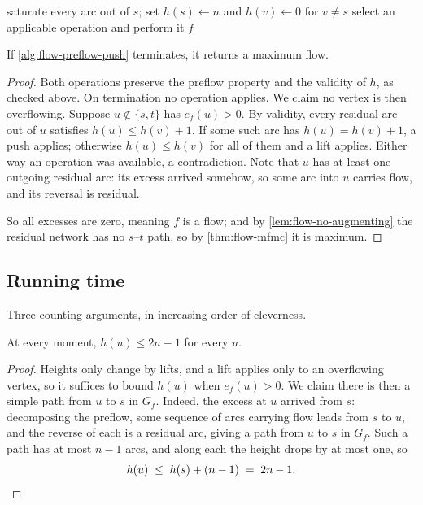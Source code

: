 \begin{algorithm}[ht]
\caption{Generic preflow-push}
\label{alg:flow-preflow-push}
\begin{algorithmic}[1]
  \State saturate every arc out of $s$; set $h(s) \gets n$ and
         $h(v) \gets 0$ for $v \ne s$
     \State select an applicable operation and perform it
  \EndWhile
  \State \Return $f$
\end{algorithmic}
\end{algorithm}

\begin{theorem}\label{thm:flow-preflow-push-correct}
If \cref{alg:flow-preflow-push} terminates, it returns a maximum flow.
\end{theorem}

\begin{proof}
Both operations preserve the preflow property and the validity of $h$, as
checked above. On termination no operation applies. We claim no vertex is then
overflowing. Suppose $u \notin \{s,t\}$ has $e_f(u) > 0$. By validity, every
residual arc out of $u$ satisfies $h(u) \le h(v)+1$. If some such arc has
$h(u) = h(v)+1$, a push applies; otherwise $h(u) \le h(v)$ for all of them and a
lift applies. Either way an operation was available, a contradiction. Note that
$u$ has at least one outgoing residual arc: its excess arrived somehow, so some
arc into $u$ carries flow, and its reversal is residual.

So all excesses are zero, meaning $f$ is a flow; and by
\cref{lem:flow-no-augmenting} the residual network has no $s$--$t$ path, so by
\cref{thm:flow-mfmc} it is maximum.
\end{proof}

\subsection{Running time}

Three counting arguments, in increasing order of cleverness.

\begin{lemma}\label{lem:flow-height-bound}
At every moment, $h(u) \le 2n-1$ for every $u$.
\end{lemma}

\begin{proof}
Heights only change by lifts, and a lift applies only to an overflowing vertex,
so it suffices to bound $h(u)$ when $e_f(u) > 0$. We claim there is then a
simple path from $u$ to $s$ in $G_f$. Indeed, the excess at $u$ arrived from
$s$: decomposing the preflow, some sequence of arcs carrying flow leads from
$s$ to $u$, and the reverse of each is a residual arc, giving a path from $u$
to $s$ in $G_f$. Such a path has at most $n-1$ arcs, and along each the height
drops by at most one, so
\[ h(u) \;\le\; h(s) + (n-1) \;=\; 2n-1. \qedhere \]
\end{proof}

